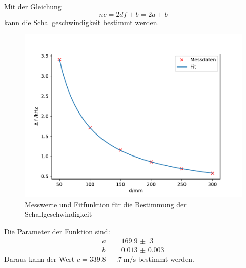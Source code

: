 Mit der Gleichung 
\begin{equation*}
    nc = 2df +b =2a+b
\end{equation*}
kann die Schallgeschwindigkeit bestimmt werden.
\FloatBarrier
\begin{figure}
    \includegraphics[width = \textwidth]{figure/Schallgeschwindigkeit.pdf}
    \caption{Messwerte und Fitfunktion für die Bestimmung der Schallgeschwindigkeit}
\end{figure}
\FloatBarrier
Die Parameter der Funktion sind:
\begin{align*}
    a&= \num{169.9(3)}\\
    b&= \num{0.013(3)}
\end{align*}
Daraus kann der Wert $c=\SI{339.8(7)}{\meter\per\second}$ bestimmt werden.

